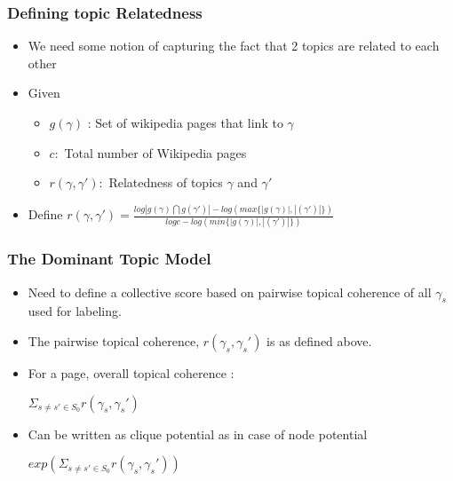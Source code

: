 \documentclass{beamer}
\begin{document}
 \begin{frame}
  \frametitle{Defining topic Relatedness}
  \begin{itemize}
   \item We need some notion of capturing the fact that 2 topics are related to each other \medskip
   \item Given
   \begin{itemize}
    \item $g(\gamma)$ : Set of wikipedia pages that link to $\gamma$
    \item $c :$ Total number of Wikipedia pages
    \item $r(\gamma, \gamma') :$ Relatedness of topics $\gamma$ and $\gamma'$
   \end{itemize}\bigskip

    
   \item Define $ r(\gamma, \gamma') = \frac{log|g(\gamma) \bigcap g(\gamma')| - log(max\{|g(\gamma)|, |(\gamma')|\})} {log c - log(min\{|g(\gamma)|, |(\gamma')|\})}$ 

  \end{itemize}

  
 \end{frame}

 
 \begin{frame}
  \frametitle{The Dominant Topic Model}
  \begin{itemize}
   \item Need to define a collective score based on pairwise topical coherence of all $\gamma_s$ used for labeling. \medskip
   \item The pairwise topical coherence, $r(\gamma_s, \gamma_s')$ is as defined above.\medskip
   \item For a page, overall topical coherence : \begin{center}\medskip
                                                  $\Sigma_{s \neq s' \in S_0}r(\gamma_s, \gamma_s')$
                                                 \end{center}
   \item Can be written as clique potential as in case of node potential\medskip
      \begin{center}
	$exp(\Sigma_{s \neq s' \in S_0}r(\gamma_s, \gamma_s'))$
      \end{center}

  \end{itemize}

 \end{frame}
\end{document}
